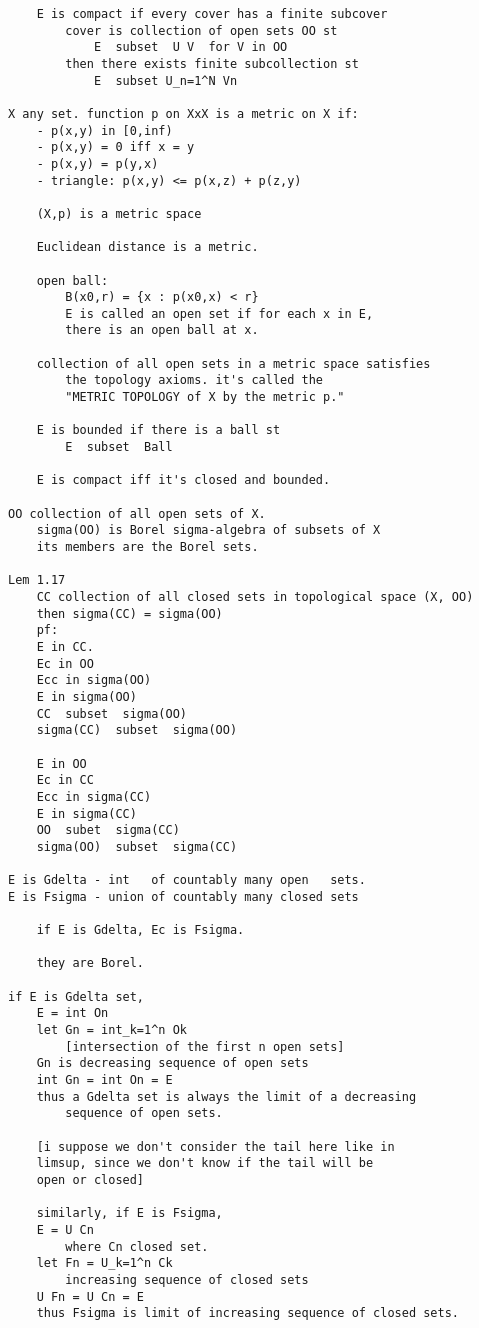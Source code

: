 \documentclass{article}
\begin{document}
\begin{flushleft}
\begin{verbatim}
    E is compact if every cover has a finite subcover
        cover is collection of open sets OO st
            E  subset  U V  for V in OO  
        then there exists finite subcollection st 
            E  subset U_n=1^N Vn

X any set. function p on XxX is a metric on X if:
    - p(x,y) in [0,inf) 
    - p(x,y) = 0 iff x = y
    - p(x,y) = p(y,x)
    - triangle: p(x,y) <= p(x,z) + p(z,y)

    (X,p) is a metric space 

    Euclidean distance is a metric.

    open ball: 
        B(x0,r) = {x : p(x0,x) < r} 
        E is called an open set if for each x in E,
        there is an open ball at x.

    collection of all open sets in a metric space satisfies 
        the topology axioms. it's called the 
        "METRIC TOPOLOGY of X by the metric p."

    E is bounded if there is a ball st 
        E  subset  Ball 
    
    E is compact iff it's closed and bounded. 

OO collection of all open sets of X.
    sigma(OO) is Borel sigma-algebra of subsets of X
    its members are the Borel sets. 

Lem 1.17
    CC collection of all closed sets in topological space (X, OO)
    then sigma(CC) = sigma(OO)
    pf:
    E in CC. 
    Ec in OO 
    Ecc in sigma(OO)
    E in sigma(OO)
    CC  subset  sigma(OO)
    sigma(CC)  subset  sigma(OO)

    E in OO 
    Ec in CC 
    Ecc in sigma(CC)
    E in sigma(CC)
    OO  subet  sigma(CC)
    sigma(OO)  subset  sigma(CC)

E is Gdelta - int   of countably many open   sets.
E is Fsigma - union of countably many closed sets 

    if E is Gdelta, Ec is Fsigma. 

    they are Borel.

if E is Gdelta set,
    E = int On 
    let Gn = int_k=1^n Ok
        [intersection of the first n open sets]
    Gn is decreasing sequence of open sets 
    int Gn = int On = E 
    thus a Gdelta set is always the limit of a decreasing 
        sequence of open sets. 

    [i suppose we don't consider the tail here like in 
    limsup, since we don't know if the tail will be 
    open or closed]

    similarly, if E is Fsigma, 
    E = U Cn 
        where Cn closed set.
    let Fn = U_k=1^n Ck 
        increasing sequence of closed sets 
    U Fn = U Cn = E 
    thus Fsigma is limit of increasing sequence of closed sets.     
\end{verbatim}


\end{flushleft}
\end{document}
